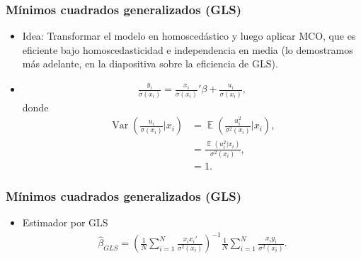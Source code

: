 \documentclass[t, compress, spanish, aspectratio=169]{beamer}
\newcommand{\compactmath}{\setlength{\abovedisplayskip}{3pt}\setlength{\belowdisplayskip}{3pt}\setlength{\abovedisplayshortskip}{0pt}\setlength{\belowdisplayshortskip}{2pt}\setlength{\jot}{1pt}} %
\DeclareMathOperator{\Var}{Var}
\DeclareMathOperator{\E}{\mathbb{E}}
\begin{document}
\begin{frame}\compactmath
    \frametitle{M\'inimos cuadrados generalizados (GLS)}
    \begin{itemize}
    \item Idea: Transformar el modelo en homosced\'astico y luego aplicar MCO, que es eficiente bajo homoscedasticidad e independencia en media (lo demostramos m\'as adelante, en la diapositiva sobre la eficiencia de GLS).
    \item []
        \begin{align*}
            \frac{y_i}{\sigma(x_i)}= \frac{x_i}{\sigma(x_i)}'\beta+\frac{u_i}{\sigma(x_i)},
        \end{align*}
        donde 
        \begin{align*}
            \Var\left(\frac{u_i}{\sigma(x_i)}|x_i\right)&=\E\left(\frac{u_i^2}{\sigma^2(x_i)}|x_i\right),\\
                                                    &=\frac{\E(u_i^2|x_i)}{\sigma^2(x_i)},\\
                                                    &=1.
        \end{align*}
    \end{itemize}
\end{frame}

\begin{frame}
    \frametitle{M\'inimos cuadrados generalizados (GLS)}
    \begin{itemize}
    \item  Estimador por GLS
    \begin{align*}
        \hat \beta_{GLS} =\left(\frac{1}{N}\sum_{i=1}^{N} \frac{x_ix_i'}{\sigma^2(x_i)}\right)^{-1} \frac{1}{N} \sum_{i=1}^{N} \frac{x_iy_i}{\sigma^2(x_i)}.
    \end{align*}
    \end{itemize}
\end{frame}
\end{document}
